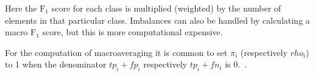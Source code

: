 Here the $\text{F}_1$ score for each class is multiplied (weighted) by the number of elements in that particular class.
Imbalances can also be handled by calculating a macro $\text{F}_1$ score, but this is more computational expensive.

For the computation of macroaveraging it is common to set $\pi_i$ (respectively $rho_i$) to 1 when the denominator $tp_i + fp_i$ respectively $tp_i + fn_i$ is 0.~\citep{debole2004supervised}.
\fi